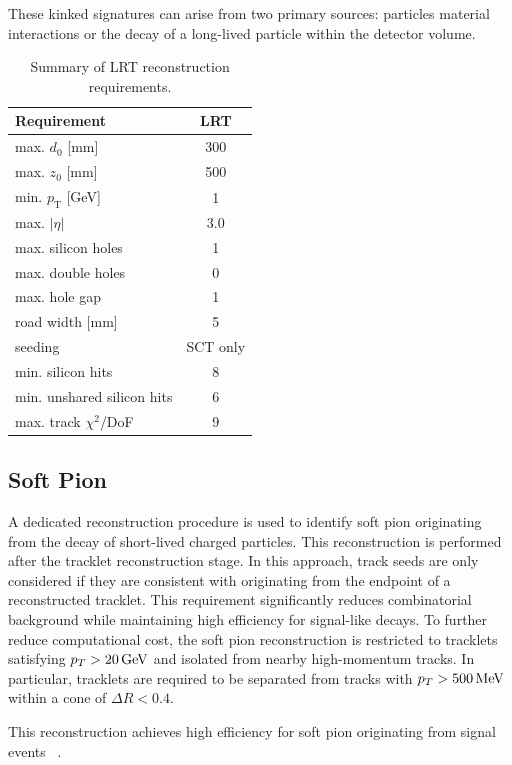 These kinked signatures can arise from two primary sources: particles material interactions or the decay of a long-lived particle within the detector volume.

\begin{table}[htbp]
  \centering
  \caption{Summary of LRT reconstruction requirements.}
  \label{tab:LRT_requirements}
  \begin{tabular}{lc}
    \hline
    Requirement & LRT \\
    \hline
	\hline
    max. $d_0$ [mm] & 300 \\
    max. $z_0$ [mm] & 500 \\
    min. $p_{\mathrm{T}}$ [GeV] & 1 \\
    max. $|\eta|$ & 3.0 \\
    max. silicon holes & 1 \\
    max. double holes & 0 \\
    max. hole gap & 1 \\
    road width [mm] & 5 \\
    seeding & SCT only \\
    min. silicon hits & 8 \\
    min. unshared silicon hits & 6 \\
    max. track $\chi^2$/DoF & 9 \\
    \hline
  \end{tabular}
\end{table}


\subsection{Soft Pion}


A dedicated reconstruction procedure is used to identify soft pion originating from the decay of short-lived charged particles. This reconstruction is performed after the tracklet reconstruction stage.
In this approach, track seeds are only considered if they are consistent with originating from the endpoint of a reconstructed tracklet. 
This requirement significantly reduces combinatorial background while maintaining high efficiency for signal-like decays.
To further reduce computational cost, the soft pion reconstruction is restricted to tracklets satisfying $p_T > 20\,\text{GeV}$ and isolated from nearby high-momentum tracks. In particular, tracklets are required to be separated from tracks with $p_T > 500\,\text{MeV}$ within a cone of $\Delta R < 0.4$. 

This reconstruction achieves high efficiency for soft pion originating from signal events ~\cite{ATL-PHYS-PUB-2019-011}.


